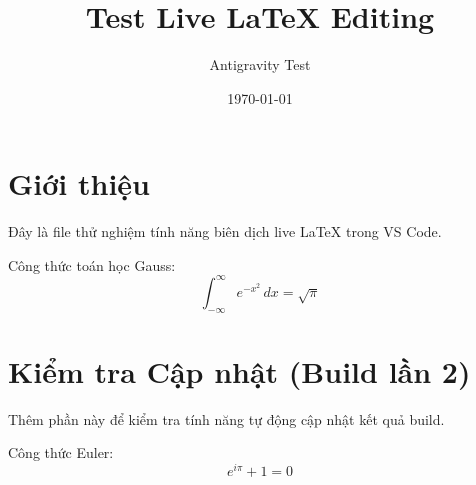 \documentclass{article}
\title{Test Live LaTeX Editing}
\author{Antigravity Test}
\date{\today}
\begin{document}
\maketitle

\section{Giới thiệu}
Đây là file thử nghiệm tính năng biên dịch live LaTeX trong VS Code.

Công thức toán học Gauss:
\begin{equation}
\int_{-\infty}^{\infty} e^{-x^2} \, dx = \sqrt{\pi}
\end{equation}

\section{Kiểm tra Cập nhật (Build lần 2)}
Thêm phần này để kiểm tra tính năng tự động cập nhật kết quả build.

Công thức Euler:
\begin{equation}
e^{i\pi} + 1 = 0
\end{equation}
\end{document}
